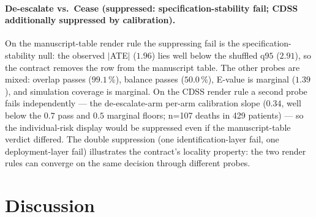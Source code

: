 \documentclass[11pt,a4paper]{article}
\begin{document}
\paragraph{De-escalate vs.\ Cease (suppressed: specification-stability fail; CDSS additionally suppressed by calibration).} On the manuscript-table render rule the suppressing fail is the specification-stability null: the observed $|$ATE$|$ ($1.96$) lies well below the shuffled q$95$ ($2.91$), so the contract removes the row from the manuscript table. The other probes are mixed: overlap passes ($99.1\,\%$), balance passes ($50.0\,\%$), E-value is marginal ($1.39$), and simulation coverage is marginal. On the CDSS render rule a second probe fails independently --- the de-escalate-arm per-arm calibration slope ($0.34$, well below the $0.7$ pass and $0.5$ marginal floors; n=107 deaths in 429 patients) --- so the individual-risk display would be suppressed even if the manuscript-table verdict differed. The double suppression (one identification-layer fail, one deployment-layer fail) illustrates the contract's locality property: the two render rules can converge on the same decision through different probes.

\section{Discussion}
\end{document}
